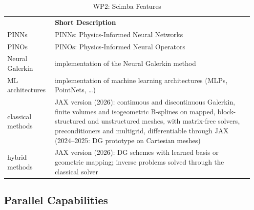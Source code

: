 \begin{table}[h!]
    \centering
    {
        \setlength{\parindent}{0pt}
        \def\arraystretch{1.25}
        {
            \fontsize{9}{11}\selectfont
            \begin{tabular}{!{\color{numpexgray}\vrule}p{.25\linewidth}!{\color{numpexgray}\vrule}p{.6885\linewidth}!{\color{numpexgray}\vrule}}
                 & {\rule{0pt}{2.5ex}\color{white}\bf Short Description } \\
                    PINNs
                 & PINNs: Physics-Informed Neural Networks                \\
                    PINOs
                 & PINOs: Physics-Informed Neural Operators               \\
                    Neural Galerkin
                 & implementation of the Neural Galerkin method           \\
                 ML architectures
                 & implementation of machine learning architectures
                (MLPs, PointNets, \dots)                                  \\
                 classical methods
                 & JAX version (2026): continuous and discontinuous
                Galerkin, finite volumes and isogeometric B-splines on
                mapped, block-structured and unstructured meshes, with
                matrix-free solvers, preconditioners and multigrid,
                differentiable through JAX
                (2024--2025: DG prototype on Cartesian meshes)            \\
                 hybrid methods
                 & JAX version (2026): DG schemes with learned basis
                or geometric mapping; inverse problems solved through
                the classical solver                                      \\
            \end{tabular}
        }
    }
    \caption{WP2: Scimba Features}
    \label{tab:WP2:Scimba:features}
\end{table}


\subsection{Parallel Capabilities}
\label{sec:WP2:Scimba:performances}

